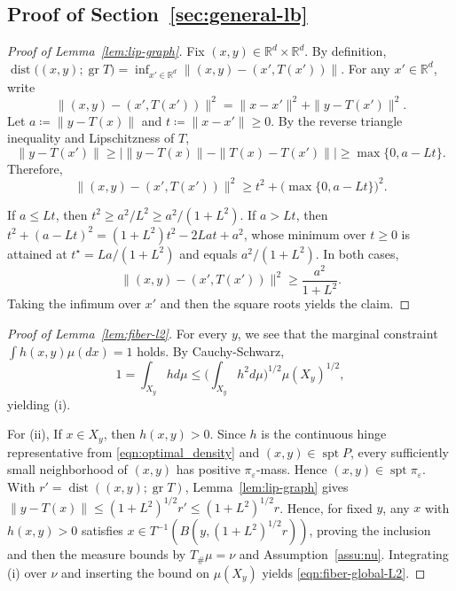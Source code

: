 \documentclass{article}
\theoremstyle{plain}
\theoremstyle{definition}
\theoremstyle{remark}
\numberwithin{equation}{section}
\DeclareMathOperator{\spt}{spt}
\DeclareMathOperator{\gr}{gr}
\DeclareMathOperator{\dist}{dist}
\newcommand{\R}{\mathbb{R}}
\begin{document}
\subsection{Proof of Section~\ref{sec:general-lb}}
\begin{proof}[Proof of Lemma~\ref{lem:lip-graph}]
Fix $(x,y)\in\R^d\times\R^d$.
By definition, $\dist\big((x,y);\gr T\big)=\inf_{x'\in\R^d} \big\|(x,y)-(x',T(x'))\big\|$.
For any $x'\in\R^d$, write
$$
\big\|(x,y)-(x',T(x'))\big\|^2=\|x-x'\|^2+\|y-T(x')\|^2.
$$
Let $a\coloneqq\|y-T(x)\|$ and $t\coloneqq\|x-x'\|\ge 0$.
By the reverse triangle inequality and Lipschitzness of $T$,
$$
\|y-T(x')\|\ge\big|\|y-T(x)\|-\|T(x)-T(x')\|\big|\ge\max\{0,a-Lt\}.
$$
Therefore,
$$
\big\|(x,y)-(x',T(x'))\big\|^2\ge t^2+\big(\max\{0,a-Lt\}\big)^2.
$$

If $a\le Lt$, then $t^2 \ge a^2/L^2 \ge a^2/(1+L^2)$.
If $a>Lt$, then $t^2+(a-Lt)^2=(1+L^2)t^2-2Lat+a^2$, whose minimum over $t\ge 0$ is attained at $t^\star=La/(1+L^2)$ and equals $a^2/(1+L^2)$.
In both cases,
$$
\big\|(x,y)-(x',T(x'))\big\|^2\ge\frac{a^2}{1+L^2}.
$$
Taking the infimum over $x'$ and then the square roots yields the claim.
\end{proof}
\begin{proof}[Proof of Lemma~\ref{lem:fiber-l2}]
For every $y$, we see that the marginal constraint $\int h(x,y)\mu(dx)=1$ holds. By Cauchy-Schwarz,
$$
1=\int_{X_y}hd\mu\le\Big(\int_{X_y} h^2d\mu\Big)^{1/2}\mu(X_y)^{1/2},
$$
yielding (i). 

For (ii), If $x\in X_y$, then $h(x,y)>0$. 
Since $h$ is the continuous hinge representative from \eqref{eqn:optimal_density} and $(x,y)\in\spt P$, every sufficiently small neighborhood of $(x,y)$ has positive $\pi_\varepsilon$-mass. 
Hence $(x,y)\in\spt\pi_\varepsilon$. With $r'=\dist((x,y);\gr T)$, Lemma~\ref{lem:lip-graph} gives $\|y-T(x)\|\le(1+L^2)^{1/2}r'\le(1+L^2)^{1/2}r$.
Hence, for fixed $y$, any $x$ with $h(x,y)>0$ satisfies $x\in T^{-1}(B(y,(1+L^2)^{1/2}r))$, proving the inclusion and then the measure bounds by $T_\#\mu=\nu$ and Assumption~\ref{assu:nu}.
Integrating (i) over $\nu$ and inserting the bound on $\mu(X_y)$ yields \eqref{eqn:fiber-global-L2}.
\end{proof}
\end{document}
